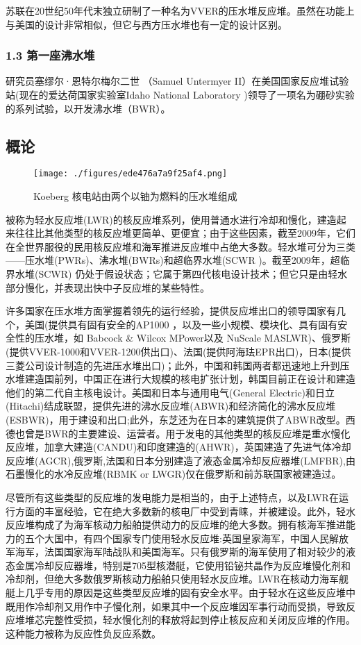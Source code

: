 苏联在20世纪50年代末独立研制了一种名为VVER的压水堆反应堆。虽然在功能上与美国的设计非常相似，但它与西方压水堆也有一定的设计区别。

\subsubsection{1.3 第一座沸水堆}
研究员塞缪尔·恩特尔梅尔二世 （Samuel Untermyer II）在美国国家反应堆试验站(现在的爱达荷国家实验室Idaho National Laboratory )领导了一项名为硼砂实验的系列试验，以开发沸水堆（BWR）。

\subsection{概论}
\begin{figure}[ht]
\centering
\texttt{[image: ./figures/ede476a7a9f25af4.png]}
\caption{Koeberg 核电站由两个以铀为燃料的压水堆组成} \label{fig_QSFYD_1}
\end{figure}
被称为轻水反应堆(LWR)的核反应堆系列，使用普通水进行冷却和慢化，建造起来往往比其他类型的核反应堆更简单、更便宜；由于这些因素，截至2009年，它们在全世界服役的民用核反应堆和海军推进反应堆中占绝大多数。轻水堆可分为三类——压水堆(PWRs)、沸水堆(BWRs)和超临界水堆(SCWR )。截至2009年，超临界水堆(SCWR) 仍处于假设状态；它属于第四代核电设计技术；但它只是由轻水部分慢化，并表现出快中子反应堆的某些特性。

许多国家在压水堆方面掌握着领先的运行经验，提供反应堆出口的领导国家有几个，美国(提供具有固有安全的AP1000 ，以及一些小规模、模块化、具有固有安全性的压水堆，如 Babcock & Wilcox MPower以及 NuScale MASLWR)、俄罗斯(提供VVER-1000和VVER-1200供出口)、法国(提供阿海珐EPR出口)，日本(提供三菱公司设计制造的先进压水堆出口)；此外，中国和韩国两者都迅速地上升到压水堆建造国前列，中国正在进行大规模的核电扩张计划，韩国目前正在设计和建造他们的第二代自主核电设计。美国和日本与通用电气(General Electric)和日立(Hitachi)结成联盟，提供先进的沸水反应堆(ABWR)和经济简化的沸水反应堆(ESBWR)，用于建设和出口;此外，东芝还为在日本的建筑提供了ABWR改型。西德也曾是BWR的主要建设、运营者。用于发电的其他类型的核反应堆是重水慢化反应堆，加拿大建造(CANDU)和印度建造的(AHWR)，英国建造了先进气体冷却反应堆(AGCR),俄罗斯,法国和日本分别建造了液态金属冷却反应器堆(LMFBR),由石墨慢化的水冷反应堆(RBMK or LWGR)仅在俄罗斯和前苏联国家被建造过。

尽管所有这些类型的反应堆的发电能力是相当的，由于上述特点，以及LWR在运行方面的丰富经验，它在绝大多数新的核电厂中受到青睐，并被建设。此外，轻水反应堆构成了为海军核动力船舶提供动力的反应堆的绝大多数。拥有核海军推进能力的五个大国中，有四个国家专门使用轻水反应堆:英国皇家海军，中国人民解放军海军，法国国家海军陆战队和美国海军。只有俄罗斯的海军使用了相对较少的液态金属冷却反应器堆，特别是705型核潜艇，它使用铅铋共晶作为反应堆慢化剂和冷却剂，但绝大多数俄罗斯核动力船舶只使用轻水反应堆。LWR在核动力海军舰艇上几乎专用的原因是这些类型反应堆的固有安全水平。由于轻水在这些反应堆中既用作冷却剂又用作中子慢化剂，如果其中一个反应堆因军事行动而受损，导致反应堆堆芯完整性受损，轻水慢化剂的释放将起到停止核反应和关闭反应堆的作用。这种能力被称为反应性负反应系数。

